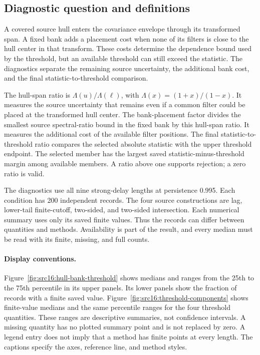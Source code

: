 \subsection{Diagnostic question and definitions}\label{sec:src16:diagnostic-definitions}

A covered source hull enters the covariance envelope through its transformed span. A fixed bank adds a placement cost when none of its filters is close to the hull center in that transform. These costs determine the dependence bound used by the threshold, but an available threshold can still exceed the statistic. The diagnostics separate the remaining source uncertainty, the additional bank cost, and the final statistic-to-threshold comparison.

The hull-span ratio is $\Lambda(u)/\Lambda(\ell)$, with $\Lambda(x)=(1+x)/(1-x)$. It measures the source uncertainty that remains even if a common filter could be placed at the transformed hull center. The bank-placement factor divides the smallest source spectral-ratio bound in the fixed bank by this hull-span ratio. It measures the additional cost of the available filter positions. The final statistic-to-threshold ratio compares the selected absolute statistic with the upper threshold endpoint. The selected member has the largest saved statistic-minus-threshold margin among available members. A ratio above one supports rejection; a zero ratio is valid.

The diagnostics use all nine strong-delay lengths at persistence 0.995. Each condition has 200 independent records. The four source constructions are lag, lower-tail finite-cutoff, two-sided, and two-sided intersection. Each numerical summary uses only its saved finite values. Thus the records can differ between quantities and methods. Availability is part of the result, and every median must be read with its finite, missing, and full counts.

\paragraph{Display conventions.}
Figure~\ref{fig:src16:hull-bank-threshold} shows medians and ranges from the 25th to the 75th percentile in its upper panels. Its lower panels show the fraction of records with a finite saved value. Figure~\ref{fig:src16:threshold-components} shows finite-value medians and the same percentile ranges for the four threshold quantities. These ranges are descriptive summaries, not confidence intervals. A missing quantity has no plotted summary point and is not replaced by zero. A legend entry does not imply that a method has finite points at every length. The captions specify the axes, reference line, and method styles.

